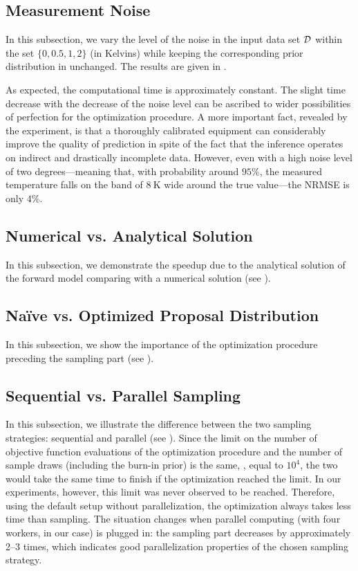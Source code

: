 \subsection{Measurement Noise}
In this subsection, we vary the level of the noise in the input data set $\mathcal{D}$ within the set $\{ 0, 0.5, 1, 2 \}$ (in Kelvins) while keeping the corresponding prior distribution in  unchanged. The results are given in .


As expected, the computational time is approximately constant. The slight time decrease with the decrease of the noise level can be ascribed to wider possibilities of perfection for the optimization procedure. A more important fact, revealed by the experiment, is that a thoroughly calibrated equipment can considerably improve the quality of prediction in spite of the fact that the inference operates on indirect and drastically incomplete data. However, even with a high noise level of two degrees---meaning that, with probability around $95\%$, the measured temperature falls on the band of $8~\text{K}$ wide around the true value---the NRMSE is only $4\%$.

\subsection{Numerical vs. Analytical Solution}
In this subsection, we demonstrate the speedup due to the analytical solution of the forward model comparing with a numerical solution (see ).

\subsection{Na\"{i}ve vs. Optimized Proposal Distribution}
In this subsection, we show the importance of the optimization procedure preceding the sampling part (see ).

\subsection{Sequential vs. Parallel Sampling}
In this subsection, we illustrate the difference between the two sampling strategies: sequential and parallel (see ). Since the limit on the number of objective function evaluations of the optimization procedure and the number of sample draws (including the burn-in prior) is the same, \ie, equal to $10^4$, the two would take the same time to finish if the optimization reached the limit. In our experiments, however, this limit was never observed to be reached. Therefore, using the default setup without parallelization, the optimization always takes less time than sampling. The situation changes when parallel computing (with four workers, in our case) is plugged in: the sampling part decreases by approximately 2–3 times, which indicates good parallelization properties of the chosen sampling strategy.
